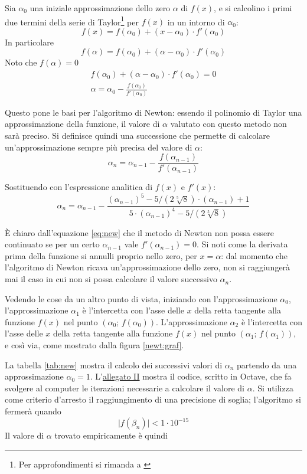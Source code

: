 Sia $\alpha_0$ una iniziale approssimazione dello zero $\alpha$ di $f(x)$, e si calcolino i primi due termini della serie di Taylor\footnote{Per approfondimenti si rimanda a \cite[128-130]{ele:mat}} per $f(x)$ in un intorno di $\alpha_0$:
\[
f(x)=f(\alpha_0)+(x-\alpha_0)\cdot f'(\alpha_0)
\]
In particolare
\[
f(\alpha)=f(\alpha_0)+(\alpha-\alpha_0)\cdot f'(\alpha_0)
\]
Noto che $f(\alpha)=0$
\begin{gather*}
f(\alpha_0)+(\alpha-\alpha_0)\cdot f'(\alpha_0)=0\\
\alpha=\alpha_0-\frac{f(\alpha_0)}{f'(\alpha_0)}
\end{gather*}

Questo pone le basi per l'algoritmo di Newton: essendo il polinomio di Taylor una approssimazione della funzione, il valore di $\alpha$ valutato con questo metodo non sarà preciso. Si definisce quindi una successione che permette di calcolare un'approssimazione sempre più precisa del valore di $\alpha$:
\begin{equation}
\alpha_n=\alpha_{n-1}-\frac{f(\alpha_{n-1})}{f'(\alpha_{n-1})}\label{eq:new}
\end{equation}

Sostituendo con l'espressione analitica di $f(x)$ e $f'(x)$:
\[
\alpha_n=\alpha_{n-1}-\frac{(\alpha_{n-1})^5-5/(2\sqrt[5]{8})\cdot (\alpha_{n-1})+1}{5\cdot(\alpha_{n-1})^4-5/(2\sqrt[5]{8})}
\]

È chiaro dall'equazione \eqref{eq:new} che il metodo di Newton non possa essere continuato se per un certo $\alpha_{n-1}$ vale $f'(\alpha_{n-1})=0$. Si noti come la derivata prima della funzione si annulli proprio nello zero, per $x=\alpha$: dal momento che l'algoritmo di Newton ricava un'approssimazione dello zero, non si raggiungerà mai il caso in cui non si possa calcolare il valore successivo $\alpha_n$.

Vedendo le cose da un altro punto di vista, iniziando con l'approssimazione $\alpha_0$, l'approssimazione $\alpha_1$ è l'intercetta con l'asse delle $x$ della retta tangente alla funzione $f(x)$ nel punto $(\alpha_0;\,f(\alpha_0))$. L'approssimazione $\alpha_2$ è l'intercetta con l'asse delle $x$ della retta tangente alla funzione $f(x)$ nel punto $(\alpha_1;\,f(\alpha_1))$, e così via, come mostrato dalla figura \ref{newt:graf}.

La tabella \ref{tab:new} mostra il calcolo dei successivi valori di $\alpha_n$ partendo da una approssimazione $\alpha_0=1$. L'\hyperref[all:2]{allegato II} mostra il codice, scritto in Octave, che fa svolgere al computer le iterazioni necessarie a calcolare il valore di $\alpha$. Si utilizza come criterio d'arresto il raggiungimento di una precisione di soglia; l'algoritmo si fermerà quando
\[
\big|f(\beta_n)\big|<1\cdot 10^{-15}
\]
Il valore di $\alpha$ trovato empiricamente è quindi

